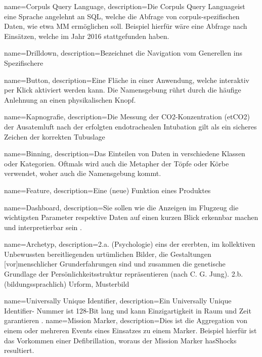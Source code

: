 {
     name=Corpuls Query Language,
     description={Die \glqq Corpuls Query Language\grqq ist eine \glqq Sprache\grqq{} angelehnt an SQL, welche die Abfrage von corpuls-spezifischen Daten, wie etwa \gls{MM} ermöglichen soll. Beispiel hierfür wäre eine Abfrage nach Einsätzen, welche im Jahr 2016 stattgefunden haben.}
}

{
     name=Drilldown,
     description={Bezeichnet die Navigation vom Generellen ins Spezifischere \cite{Walter.2008}}
}


{
     name=Button,
     description={Eine Fläche in einer Anwendung, welche interaktiv per Klick aktiviert werden kann. Die Namensgebung rührt durch die häufige Anlehnung an einen physikalischen Knopf.}
}

{
     name=Kapnografie,
     description={\glqq Die Messung der CO2-Konzentration (etCO2)  der Ausatemluft nach der erfolgten endotrachealen Intubation gilt als ein sicheres Zeichen der korrekten Tubuslage \grqq{} \cite{Wnent.2013} }
}

{
     name=Binning,
     description={Das Einteilen von Daten in verschiedene Klassen oder Kategorien. Oftmals wird auch die Metapher der Töpfe oder Körbe verwendet, woher auch die Namensgebung kommt.}
}

{
     name=Feature,
     description={Eine (neue) Funktion eines Produktes}
}

{
     name=Dashboard,
     description={Sie sollen wie die Anzeigen im Flugzeug die wichtigsten Parameter respektive Daten auf einen kurzen Blick erkennbar machen und interpretierbar sein \cite[S.18]{Engels.2015}.}
}


{
     name=Archetyp,
     description={\glqq 2.a. (Psychologie) eins der ererbten, im kollektiven Unbewussten bereitliegenden urtümlichen Bilder, die Gestaltungen [vor]menschlicher Grunderfahrungen sind und zusammen die genetische Grundlage der Persönlichkeitsstruktur repräsentieren (nach C. G. Jung).
     2.b. (bildungssprachlich) Urform, Musterbild\grqq \cite{Dudenredaktion.2015}}
}

{
     name=Universally Unique Identifier,
     description={Ein \glqq Universally Unique Identifier\grqq- Nummer ist 128-Bit lang und kann Einzigartigkeit in Raum und Zeit garantieren \cite{Leach.2005}. }
}
{
     name=Mission Marker,
     description={Dies ist die Aggregation von einem oder mehreren Events eines Einsatzes zu einem Marker. Beispiel hierfür ist das Vorkommen einer Defibrillation, woraus der Mission Marker \glqq hasShocks\grqq{} resultiert. }
}

